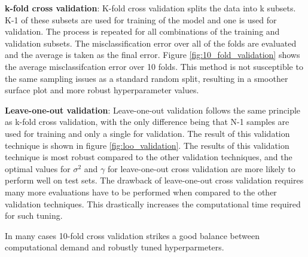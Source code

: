 \documentclass{article}
\begin{document}
            
            \noindent \textbf{k-fold cross validation}: \newline
            K-fold cross validation splits the data into k subsets. K-1 of these subsets are used for training of the model and one is used for validation. The process is repeated for all combinations of the training and validation subsets. The misclassification error over all of the folds are evaluated and the average is taken as the final error. Figure \ref{fig:10_fold_validation} shows the average misclassifcation error over 10 folds. This method is not susceptible to the same sampling issues as a standard random split, resulting in a smoother surface plot and more robust hyperparameter values. 
            
            \noindent \textbf{Leave-one-out validation}: \newline
            Leave-one-out validation follows the same principle as k-fold cross validation, with the only difference being that N-1 samples are used for training and only a single for validation. The result of this validation technique is shown in figure \ref{fig:loo_validation}. The results of this validation technique is most robust compared to the other validation techniques, and the optimal values for $\sigma^2$ and $\gamma$ for leave-one-out cross validation are more likely to perform well on test sets. The drawback of leave-one-out cross validation requires many more evaluations  have to be performed when compared to the other validation techniques. This drastically increases the computational time required for such tuning. 
            
            In many cases 10-fold cross validation strikes a good balance between computational demand and robustly tuned hyperparmeters. 
            
\end{document}
